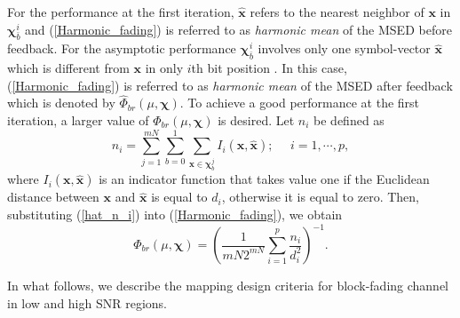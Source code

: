 \documentclass[12pt, draftclsnofoot, onecolumn]{IEEEtran}
\newcommand{\mb}[1]{\boldsymbol{#1}}
\begin{document}
 For the performance at the first iteration, $\hat{\mb x}$ refers to the nearest neighbor of $\mb{x}$ in $\mb{\chi}_{\bar{b}}^{i}$ and (\ref{Harmonic_fading}) is referred to  as \emph{harmonic mean} of the MSED before feedback. For the asymptotic performance $\mb{\chi}_{\bar{b}}^{i}$ involves only one symbol-vector $\hat{\mb{x}}$ which is different from $\mb{x}$ in only $i$th bit position \cite{Chindapol_16QAM}. In this case, (\ref{Harmonic_fading}) is referred to as \emph{harmonic mean} of the MSED after feedback which is denoted by $\hat{\Phi}_{br}(\mu, \mb{\chi})$\color{black}.
 To achieve  a good performance at the first iteration, a larger value of $\Phi_{br}(\mu, \mb{\chi})$ \color{black} is desired. Let $n_{i}$ be defined as
\begin{equation}
n_{i} = \sum_{j=1}^{mN} \sum_{b=0}^{1} \sum_{{\mb x}\in \mb{\chi}_{b}^{j}} I_{i}({\mb x}, \hat{\mb x}); ~~~~~~i = 1, \cdots, p,
\label{hat_n_i}
\end{equation} where   $I_{i}({\mb x}, \hat{\mb x})$ is an indicator function that takes value one if the Euclidean distance between ${\mb x}$ and $\hat{\mb x}$ is equal to $d_{i}$, otherwise it is equal to zero. Then, substituting  (\ref{hat_n_i}) into (\ref{Harmonic_fading}), we  obtain
\begin{equation}
\Phi_{br}(\mu, \mb{\chi}) = \left( \dfrac{1}{mN2^{mN}}\sum_{i=1}^{p} \dfrac{n_{i}}{d_{i}^{2}}\right) ^{-1}.
\label{Rewritten_Harmonic_fading}
\end{equation}\color{black}

In what follows, we describe  the mapping design criteria  for   block-fading \color{black} channel in low and high SNR regions. 
\end{document}

